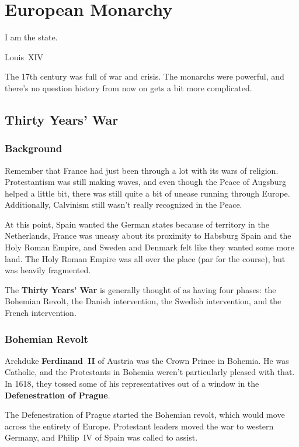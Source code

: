 \chapter{European Monarchy}

\epigraph{%
  I am the state.
}{Louis~XIV}

The 17th century was full of war and crisis.
The monarchs were powerful, and there's no question history from now on gets a bit more complicated.

\section{Thirty Years' War}

\subsection*{Background}

Remember that France had just been through a lot with its wars of religion.
Protestantism was still making waves, and even though the Peace of Augsburg helped a little bit,
there was still quite a bit of unease running through Europe.
Additionally, Calvinism still wasn't really recognized in the Peace.

At this point,
Spain wanted the German states because of territory in the Netherlands,
France was uneasy about its proximity to Habsburg Spain and the Holy Roman Empire,
and Sweden and Denmark felt like they wanted some more land.
The Holy Roman Empire was all over the place (par for the course), but was heavily fragmented.

The \textbf{Thirty Years' War} is generally thought of as having four phases:
the Bohemian Revolt,
the Danish intervention,
the Swedish intervention,
and the French intervention.

\subsection*{Bohemian Revolt}

Archduke \textbf{Ferdinand~II} of Austria was the Crown Prince in Bohemia.
He was Catholic, and the Protestants in Bohemia weren't particularly pleased with that.
In 1618, they tossed some of his representatives out of a window in the \textbf{Defenestration of Prague}.

The Defenestration of Prague started the Bohemian revolt, which would move across the entirety of Europe.
Protestant leaders moved the war to western Germany, and Philip~IV of Spain was called to assist.

